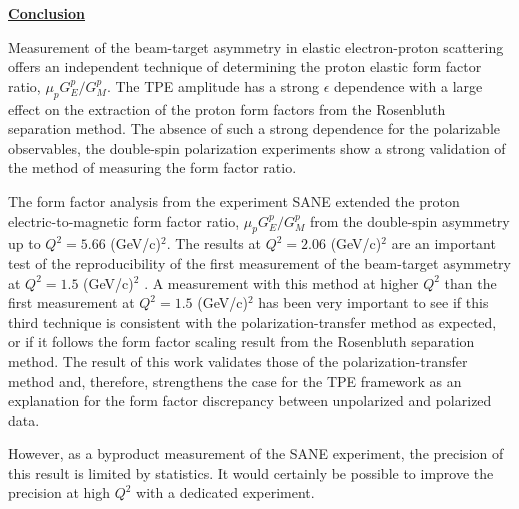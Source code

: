 \documentclass[12pt]{article}
\begin{document}
{
\raggedleft
\underline{\textbf{Conclusion}}
}

Measurement of the beam-target asymmetry in elastic electron-proton scattering offers an independent technique of determining the proton elastic form factor ratio, $\mu_p G_E^p/G_M^p$. The TPE amplitude has a strong $\epsilon$ dependence with a large effect on the extraction of the proton form factors from the Rosenbluth separation method. The absence of such a strong dependence for the polarizable observables, the double-spin polarization experiments show a strong validation of the method of measuring the form factor ratio.

 The form factor analysis from the experiment SANE extended the proton electric-to-magnetic form factor ratio, $\mu_p G_E^p/G_M^p$ from the double-spin asymmetry up to $Q^2=5.66$ (GeV/c)$^2$. The results at $Q^2=2.06$ (GeV/c)$^2$ are an important test of the reproducibility of the first measurement of the beam-target asymmetry at $Q^2=1.5$ (GeV/c)$^2$ \cite{60}. A measurement with this method at higher $Q^2$ than the first measurement at $Q^2=1.5$ (GeV/c)$^2$ has been very important to see if this third technique is consistent with the polarization-transfer method as expected, or if it follows the form factor scaling result from the Rosenbluth separation method. The result of this work validates those of the polarization-transfer method and, therefore, strengthens the case for the TPE framework as an explanation for the form factor discrepancy between unpolarized and polarized data.

However, as a byproduct measurement of the SANE experiment, the precision of this result is limited by statistics. It would certainly be possible to improve the precision at high $Q^2$ with a dedicated experiment. 

\clearpage
\singlespacing


\end{document}
